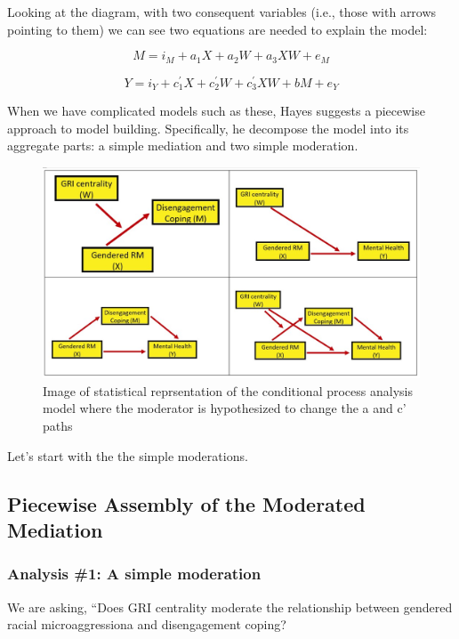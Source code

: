 \documentclass[
  11pt,
]{book}
\begin{document}
Looking at the diagram, with two consequent variables (i.e., those with arrows pointing to them) we can see two equations are needed to explain the model:

\[M = i_{M}+a_{1}X + a_{2}W + a_{3}XW + e_{M}\]

\[Y = i_{Y}+c_{1}^{'}X+ c_{2}^{'}W+c_{3}^{'}XW+ bM+e_{Y}\]

When we have complicated models such as these, Hayes \citeyearpar{hayes_introduction_2018} suggests a piecewise approach to model building. Specifically, he decompose the model into its aggregate parts: a simple mediation and two simple moderation.

\begin{figure}
\centering
\includegraphics{images/ModMed/PiecewiseAssembly.jpg}
\caption{Image of statistical reprsentation of the conditional process analysis model where the moderator is hypothesized to change the a and c' paths}
\end{figure}

Let's start with the the simple moderations.

\hypertarget{piecewise-assembly-of-the-moderated-mediation}{%
\subsection{Piecewise Assembly of the Moderated Mediation}\label{piecewise-assembly-of-the-moderated-mediation}}

\hypertarget{analysis-1-a-simple-moderation}{%
\subsubsection{Analysis \#1: A simple moderation}\label{analysis-1-a-simple-moderation}}

We are asking, ``Does GRI centrality moderate the relationship between gendered racial microaggressiona and disengagement coping?
\end{document}
